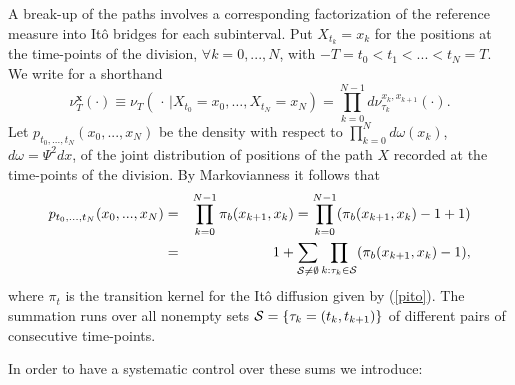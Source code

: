 \documentclass[a4paper,11pt]{article}
\begin{document}
A break-up of the paths involves a corresponding factorization of the 
reference measure into It\^o bridges for each subinterval. Put $X_{t_k} = 
x_k$ for the positions at the time-points of the division, $\forall 
k = 0,...,N$, with $-T = t_0 < t_1 < ... < t_N = T$. We write for a 
shorthand
\begin{equation}
\nu_T^{\mathbf{x}}(\cdot) \equiv \nu_T(\, \cdot \,| X_{t_0} = x_0, \ldots , 
X_{t_N} = x_N) = \prod_{k=0}^{N-1} d\nu_{\tau_k}^{x_k,x_{k+1}}(\cdot).
\label{mar}
\end{equation}
Let $p_{t_0,...,t_N} (x_0,...,x_N)$ be the density with respect to 
$\prod_{k=0}^N d\omega(x_k)$, $d\omega = \Psi^2 dx$, of the joint 
distribution of positions of the path $X$ recorded at the time-points 
of the division. 
By Markovianness it follows that
\begin{eqnarray}
p_{t_0,...,t_N} (x_0,...,x_N) 
& = &
\prod_{k=0}^{N-1} \pi_b(x_{k+1},x_k) = \prod_{k=0}^{N-1} 
(\pi_b(x_{k+1},x_k) - 1 + 1)  
\nonumber \\ 
& = &
1 + \sum_{\cal S \neq \emptyset} \prod_{k: \tau_k \in {\cal S}} 
(\pi_b(x_{k+1},x_k) - 1),
\nonumber
\end{eqnarray}
where $\pi_t$ is the transition kernel for the It\^o diffusion given by
(\ref{pito}). The summation runs over all nonempty sets ${\cal S} = 
\{\tau_k = (t_k,t_{k+1})\}$ of different pairs of consecutive time-points. 

In order to have a systematic control over these sums we introduce:
\end{document}
